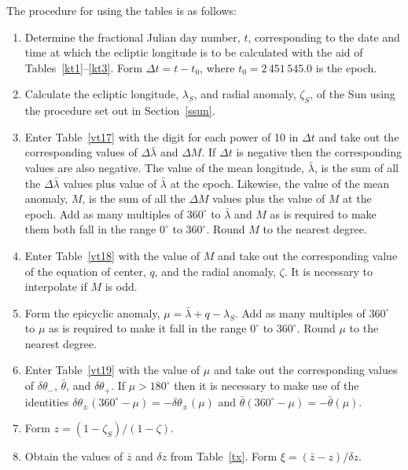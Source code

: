 The procedure for using the tables is as follows:
\begin{enumerate}

\item Determine the fractional Julian day number, $t$, corresponding to the date and time
at which the  ecliptic longitude is to be calculated  with the aid of Tables~\ref{kt1}--\ref{kt3}. Form $\Delta t = t-t_0$, where $t_0=2\,451\,545.0$ is the epoch. 

\item Calculate the ecliptic longitude, $\lambda_S$, and radial anomaly,
$\zeta_S$, of the Sun using the procedure set out in Section~\ref{ssun}.

\item Enter Table~\ref{vt17} with the digit for each power of 10
in ${\Delta} t$ and take out the corresponding values of $\Delta\bar{\lambda}$ and $\Delta M$. If $\Delta t$ is negative then the corresponding
values are also negative.
The value of the mean longitude, $\bar{\lambda}$, is the
sum of all the $\Delta\bar{\lambda}$ values plus value of $\bar{\lambda}$ at the epoch. Likewise, the value of the mean anomaly, $M$, is
the sum of all the $\Delta M$ values plus the value of $M$ at the epoch. 
Add as many multiples of $360^\circ$ to $\bar{\lambda}$ and $M$
as is required to make them both fall in the range $0^\circ$ to $360^\circ$. Round $M$ to the nearest degree. 

\item Enter Table~\ref{vt18} with the value of $M$ and take out the
corresponding value of the equation of center, $q$, and the radial anomaly, $\zeta$. It is necessary to interpolate if $M$ is odd.

\item Form the epicyclic anomaly, $\mu = \bar{\lambda}+q-\lambda_S$. Add as many multiples of $360^\circ$ to $\mu$ as is required to make it fall in the range $0^\circ$ to $360^\circ$. Round $\mu$ to the nearest degree.

\item Enter Table~\ref{vt19} with the value of $\mu$ and take
out the corresponding values of $\delta\theta_-$, $\bar{\theta}$, and
$\delta\theta_+$. If $\mu > 180^\circ$ then it is necessary to make use
of the identities $\delta\theta_\pm(360^\circ - \mu) =-\delta\theta_\pm(\mu)$
and $\bar{\theta}(360^\circ - \mu) =-\bar{\theta}(\mu)$.

\item Form $z = (1-\zeta_S)/(1-\zeta)$.

\item Obtain the values of $\bar{z}$ and $\delta z$ from Table~\ref{tx}.
Form $\xi = (\bar{z}-z)/\delta z$.


\end{enumerate}
